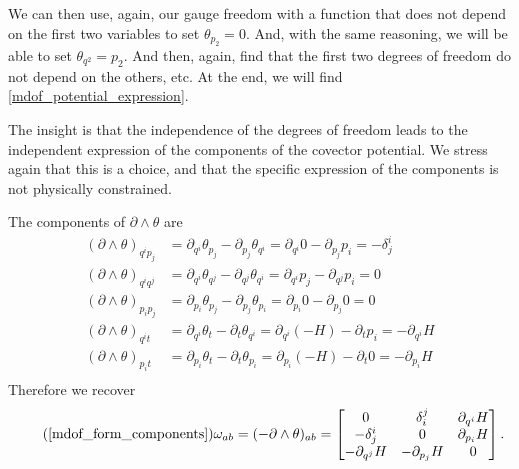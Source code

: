\documentclass[fleqn,10pt]{wlscirep}
\begin{document}
We can then use, again, our gauge freedom with a function that does not depend on the first two variables to set $\theta_{p_2} = 0$. And, with the same reasoning, we will be able to set $\theta_{q^2} = p_2$. And then, again, find that the first two degrees of freedom do not depend on the others, etc. At the end, we will find \ref{mdof_potential_expression}.

The insight is that the independence of the degrees of freedom leads to the independent expression of the components of the covector potential. We stress again that this is a choice, and that the specific expression of the components is not physically constrained.

The components of $\partial \wedge\theta$ are
\begin{equation}
	\begin{aligned}
		(\partial \wedge\theta)_{q^i p_j} &= \partial_{q^i}\theta_{p_j} - \partial_{p_j}\theta_{q^i} = \partial_{q^i} 0 - \partial_{p_j} p_i= - \delta^i_j \\
		(\partial \wedge\theta)_{q^i q^j} &= \partial_{q^i}\theta_{q^j} - \partial_{q^j}\theta_{q^i} = \partial_{q^i}p_j - \partial_{q^j}p_i = 0 \\
		(\partial \wedge\theta)_{p_i p_j} &= \partial_{p_i}\theta_{p_j} - \partial_{p_j}\theta_{p_i} = \partial_{p_i} 0 - \partial_{p_j} 0 = 0 \\
		(\partial \wedge\theta)_{q^i t} &= \partial_{q^i}\theta_{t} - \partial_{t}\theta_{q^i} = \partial_{q^i} (-H) - \partial_{t} p_i= - \partial_{q^i} H \\
		(\partial \wedge\theta)_{p_i t} &= \partial_{p_i}\theta_{t} - \partial_{t}\theta_{p_i} = \partial_{p_i} (-H) - \partial_{t} 0= - \partial_{p_i} H \\
	\end{aligned}
\end{equation}
Therefore we recover
\begin{equation}
	\tag*{(\ref{mdof_form_components})}
	\omega_{ab}=(-\partial \wedge\theta)_{ab} = \begin{bmatrix}
		0 & \delta^j_i & \partial_{q^i} H \\
		-\delta^i_j & 0 & \partial_{p_i} H \\
		- \partial_{q^j} H & - \partial_{p_j} H & 0
	\end{bmatrix}.
\end{equation}
\end{document}
